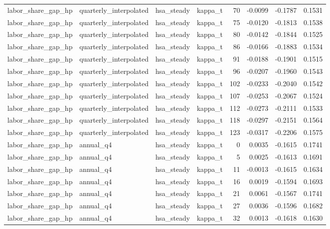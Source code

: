 \begin{tabular}{llllrrrr}
labor\_share\_gap\_hp & quarterly\_interpolated & hsa\_steady & kappa\_t & 70 & -0.0099 & -0.1787 & 0.1531 \\
labor\_share\_gap\_hp & quarterly\_interpolated & hsa\_steady & kappa\_t & 75 & -0.0120 & -0.1813 & 0.1538 \\
labor\_share\_gap\_hp & quarterly\_interpolated & hsa\_steady & kappa\_t & 80 & -0.0142 & -0.1844 & 0.1525 \\
labor\_share\_gap\_hp & quarterly\_interpolated & hsa\_steady & kappa\_t & 86 & -0.0166 & -0.1883 & 0.1534 \\
labor\_share\_gap\_hp & quarterly\_interpolated & hsa\_steady & kappa\_t & 91 & -0.0188 & -0.1901 & 0.1515 \\
labor\_share\_gap\_hp & quarterly\_interpolated & hsa\_steady & kappa\_t & 96 & -0.0207 & -0.1960 & 0.1543 \\
labor\_share\_gap\_hp & quarterly\_interpolated & hsa\_steady & kappa\_t & 102 & -0.0233 & -0.2040 & 0.1542 \\
labor\_share\_gap\_hp & quarterly\_interpolated & hsa\_steady & kappa\_t & 107 & -0.0253 & -0.2067 & 0.1524 \\
labor\_share\_gap\_hp & quarterly\_interpolated & hsa\_steady & kappa\_t & 112 & -0.0273 & -0.2111 & 0.1533 \\
labor\_share\_gap\_hp & quarterly\_interpolated & hsa\_steady & kappa\_t & 118 & -0.0297 & -0.2151 & 0.1564 \\
labor\_share\_gap\_hp & quarterly\_interpolated & hsa\_steady & kappa\_t & 123 & -0.0317 & -0.2206 & 0.1575 \\
labor\_share\_gap\_hp & annual\_q4 & hsa\_steady & kappa\_t & 0 & 0.0035 & -0.1615 & 0.1741 \\
labor\_share\_gap\_hp & annual\_q4 & hsa\_steady & kappa\_t & 5 & 0.0025 & -0.1613 & 0.1691 \\
labor\_share\_gap\_hp & annual\_q4 & hsa\_steady & kappa\_t & 11 & -0.0013 & -0.1615 & 0.1634 \\
labor\_share\_gap\_hp & annual\_q4 & hsa\_steady & kappa\_t & 16 & 0.0019 & -0.1594 & 0.1693 \\
labor\_share\_gap\_hp & annual\_q4 & hsa\_steady & kappa\_t & 21 & 0.0061 & -0.1567 & 0.1741 \\
labor\_share\_gap\_hp & annual\_q4 & hsa\_steady & kappa\_t & 27 & 0.0036 & -0.1596 & 0.1682 \\
labor\_share\_gap\_hp & annual\_q4 & hsa\_steady & kappa\_t & 32 & 0.0013 & -0.1618 & 0.1630 \\

\end{tabular}

